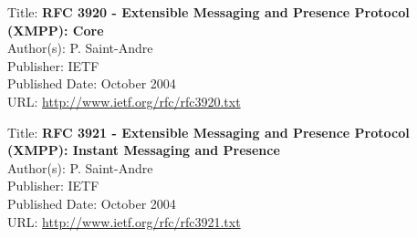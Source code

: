 Title: \textbf{RFC 3920 - Extensible Messaging and Presence Protocol (XMPP): Core} \\ 
Author(s): P. Saint-Andre \\
Publisher: IETF \\ 
Published Date: October 2004 \\ 
URL: \url{http://www.ietf.org/rfc/rfc3920.txt}   


Title: \textbf{RFC 3921 - Extensible Messaging and Presence Protocol (XMPP): Instant Messaging and Presence} \\ 
Author(s): P. Saint-Andre \\
Publisher: IETF \\ 
Published Date: October 2004 \\ 
URL: \url{http://www.ietf.org/rfc/rfc3921.txt}   
